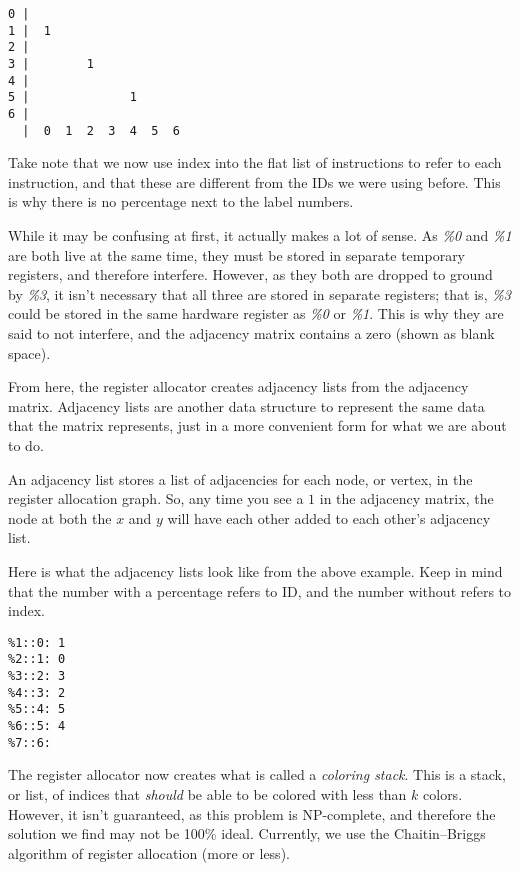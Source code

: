 \documentclass[
12pt,
letterpaper,
oneside,
]{memoir}
\begin{document}
\begin{verbatim}
0 |
1 |  1
2 |
3 |        1
4 |
5 |              1
6 |
  |  0  1  2  3  4  5  6
\end{verbatim}

\begin{center}
{\small Take note that we now use index into the flat list of instructions to refer to each instruction, and that these are different from the IDs we were using before. This is why there is no percentage next to the label numbers.}
\end{center}

While it may be confusing at first, it actually makes a lot of sense. As \emph{\%0} and \emph{\%1} are both live at the same time, they must be stored in separate temporary registers, and therefore interfere. However, as they both are dropped to ground by \emph{\%3}, it isn't necessary that all three are stored in separate registers; that is, \emph{\%3} could be stored in the same hardware register as \emph{\%0} or \emph{\%1}. This is why they are said to not interfere, and the adjacency matrix contains a zero (shown as blank space).

\filbreak

From here, the register allocator creates adjacency lists from the adjacency matrix. Adjacency lists are another data structure to represent the same data that the matrix represents, just in a more convenient form for what we are about to do.

An adjacency list stores a list of adjacencies for each node, or vertex, in the register allocation graph. So, any time you see a $1$ in the adjacency matrix, the node at both the $x$ and $y$ will have each other added to each other's adjacency list.

\filbreak

Here is what the adjacency lists look like from the above example. Keep in mind that the number with a percentage refers to ID, and the number without refers to index.

\begin{verbatim}
%1::0: 1
%2::1: 0
%3::2: 3
%4::3: 2
%5::4: 5
%6::5: 4
%7::6:
\end{verbatim}

\filbreak

The register allocator now creates what is called a \emph{coloring stack}. This is a stack, or list, of indices that \emph{should} be able to be colored with less than $k$ colors. However, it isn't guaranteed, as this problem is NP-complete, and therefore the solution we find may not be 100\% ideal. Currently, we use the Chaitin--Briggs algorithm of register allocation (more or less).
\end{document}
